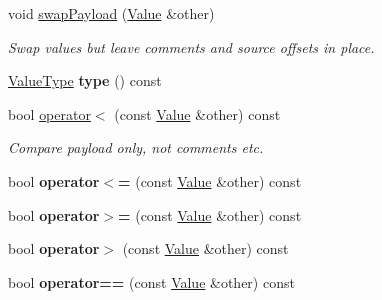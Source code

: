 \begin{DoxyCompactItemize}
\mbox{\label{class_json_1_1_value_a5263476047f20e2fc6de470e4de34fe5}} 
void \hyperlink{class_json_1_1_value_a5263476047f20e2fc6de470e4de34fe5}{swap\+Payload} (\hyperlink{class_json_1_1_value}{Value} \&other)
\begin{DoxyCompactList}\small\item\em Swap values but leave comments and source offsets in place. \end{DoxyCompactList}\item 
\mbox{\label{class_json_1_1_value_a8ce61157a011894f0252ceed232312de}} 
\hyperlink{namespace_json_a7d654b75c16a57007925868e38212b4e}{Value\+Type} {\bfseries type} () const
\item 
\mbox{\label{class_json_1_1_value_aac6bd14155b88ed2d39ef54820b39e49}} 
bool \hyperlink{class_json_1_1_value_aac6bd14155b88ed2d39ef54820b39e49}{operator$<$} (const \hyperlink{class_json_1_1_value}{Value} \&other) const
\begin{DoxyCompactList}\small\item\em Compare payload only, not comments etc. \end{DoxyCompactList}\item 
\mbox{\label{class_json_1_1_value_a40c411a320a416d5eac0052b36211286}} 
bool {\bfseries operator$<$=} (const \hyperlink{class_json_1_1_value}{Value} \&other) const
\item 
\mbox{\label{class_json_1_1_value_afe2c3e52df60b9622cbd8358b74bdbf5}} 
bool {\bfseries operator$>$=} (const \hyperlink{class_json_1_1_value}{Value} \&other) const
\item 
\mbox{\label{class_json_1_1_value_a4646c2f0764908c0972160c7c2ebe567}} 
bool {\bfseries operator$>$} (const \hyperlink{class_json_1_1_value}{Value} \&other) const
\item 
\mbox{\label{class_json_1_1_value_a16f9250e30d5c4505cd11137c564a764}} 
bool {\bfseries operator==} (const \hyperlink{class_json_1_1_value}{Value} \&other) const
\item 
\mbox{\label{class_json_1_1_value_a86e95be072e515c48abc61dec63a1689}} 

\end{DoxyCompactItemize}
